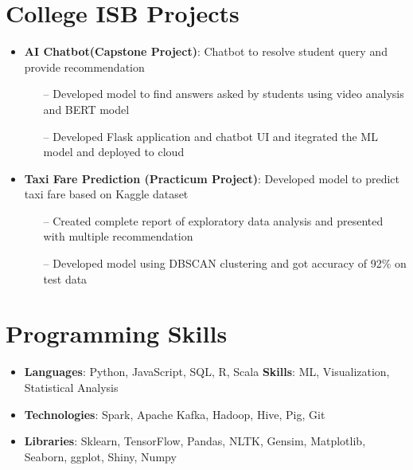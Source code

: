 \documentclass[letterpaper,11pt]{article}
\newcommand{\resumeItem}[2]{
  \item\small{
    \textbf{#1}{: #2 \vspace{-2pt}}
  }
}
\newcommand{\resumeSubItem}[2]{\resumeItem{#1}{#2}\vspace{-4pt}}
\newcommand{\resumeSubHeadingListStart}{\begin{itemize}[leftmargin=*]}
\newcommand{\resumeSubHeadingListEnd}{\end{itemize}}
\begin{document}
\section{College ISB Projects}
  \resumeSubHeadingListStart
    \resumeSubItem{AI Chatbot(Capstone Project)}
      {Chatbot to resolve student query and provide recommendation}
        \begin{itemize}
            \item[--] Developed model to find answers asked by students using video analysis and BERT model
            \item[--] Developed Flask application and chatbot UI and itegrated the ML model and deployed to cloud
        \end{itemize}
    \resumeSubItem{Taxi Fare Prediction (Practicum Project)}
      {Developed model to predict taxi fare based on Kaggle dataset}
        \begin{itemize}
            \item[--] Created complete report of exploratory data analysis and presented with multiple recommendation
            \item[--] Developed model using DBSCAN clustering and got accuracy of 92\% on test data
        \end{itemize}
  \resumeSubHeadingListEnd

\section{Programming Skills}
 \resumeSubHeadingListStart
   \item{
     \textbf{Languages}{: Python, JavaScript, SQL, R, Scala}
     \hfill
     \textbf{Skills}{: ML, Visualization, Statistical Analysis}
   }
   \item {
     \textbf{Technologies}{: Spark, Apache Kafka, Hadoop, Hive, Pig, Git}
   }
   \item {
     \textbf{Libraries}{: Sklearn, TensorFlow, Pandas, NLTK, Gensim, Matplotlib, Seaborn, ggplot, Shiny, Numpy}
   }
 \resumeSubHeadingListEnd


\end{document}
